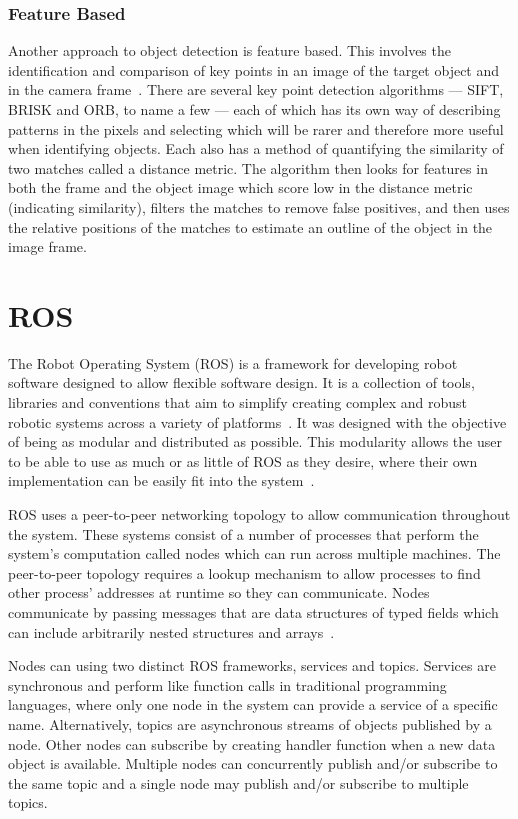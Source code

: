 \subsubsection{Feature Based}\label{litreview/cv/objDet/fb}
Another approach to object detection is feature based. This 
involves the identification and comparison of key points in an 
image of the target object and in the camera frame~\cite{lowe2004distinctive}. There are 
several key point detection algorithms --- SIFT, BRISK and ORB, 
to name a few --- each of which has its own way of describing 
patterns in the pixels and selecting which will be rarer and 
therefore more useful when identifying objects. Each also has 
a method of quantifying the similarity of two matches called a 
distance metric. The algorithm then looks for features in both 
the frame and the object image which score low in the distance 
metric (indicating similarity), filters the matches to remove 
false positives, and then uses the relative positions of the 
matches to estimate an outline of the object in the image 
frame. 

\section{ROS}\label{litreview/ROS}
The Robot Operating System (ROS) is a framework for developing robot
software designed to allow flexible software design. It is a collection of tools, 
libraries and conventions that aim to simplify creating complex and robust robotic systems across a variety of platforms~\cite{aboutROS}. 
It was designed with the objective of being as modular and distributed
as possible. This modularity allows the user to be able to use as much or
as little of ROS as they desire, where their own implementation can be
easily fit into the system~\cite{rosForMe}.

ROS uses a peer-to-peer networking topology to allow communication 
throughout the system. These systems consist of a number of processes  
that perform the system's computation called nodes which can  
run across multiple machines. The peer-to-peer topology requires 
a lookup mechanism to allow processes to find other process' addresses at 
runtime so they can communicate. Nodes communicate by passing messages 
that are data structures of typed fields which can include arbitrarily nested 
structures and arrays~\cite{crick2017rosbridge}.


Nodes can using two distinct ROS frameworks, services and topics. 
Services are synchronous and perform like function
calls in traditional programming languages, where only one node in the 
system can provide a service of a specific name. Alternatively, topics are
asynchronous streams of objects published by a node. Other nodes can 
subscribe by creating  handler function when a new data object is available.
Multiple nodes can concurrently publish and/or subscribe to the same topic and
a single node may publish and/or subscribe to multiple topics.


